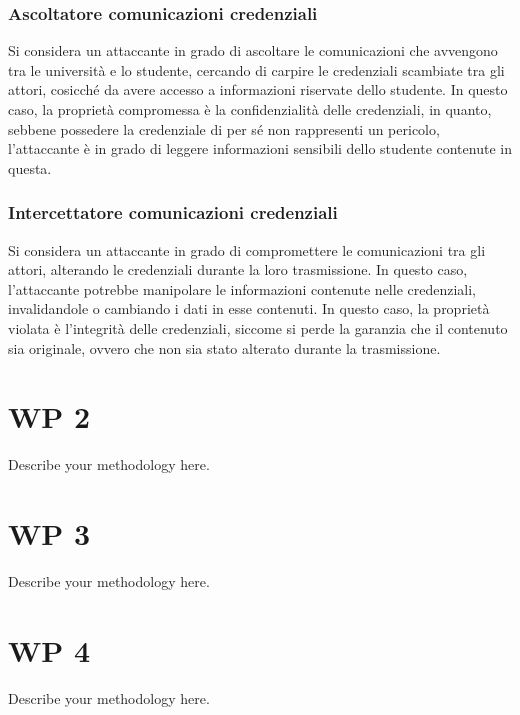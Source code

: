 \documentclass[a4paper,12pt]{article}
\begin{document}
\subsubsection{Ascoltatore comunicazioni credenziali} Si considera un attaccante in grado di ascoltare le comunicazioni che avvengono tra le università e lo studente, cercando di carpire le credenziali scambiate tra gli attori, cosicché da avere accesso a informazioni riservate dello studente.
\newline In questo caso, la proprietà compromessa è la confidenzialità delle credenziali, in quanto, sebbene possedere la credenziale di per sé non rappresenti un pericolo, l'attaccante è in grado di leggere informazioni sensibili dello studente contenute in questa.
\subsubsection{Intercettatore comunicazioni credenziali} Si considera un attaccante in grado di compromettere le comunicazioni tra gli attori, alterando le credenziali durante la loro trasmissione. In questo caso, l'attaccante potrebbe manipolare le informazioni contenute nelle credenziali, invalidandole o cambiando i dati in esse contenuti.
\newline In questo caso, la proprietà violata è l'integrità delle credenziali, siccome si perde la garanzia che il contenuto sia originale, ovvero che non sia stato alterato durante la trasmissione.

\section{WP 2}
Describe your methodology here.

\section{WP 3}
Describe your methodology here.

\section{WP 4}
Describe your methodology here.
\end{document}

